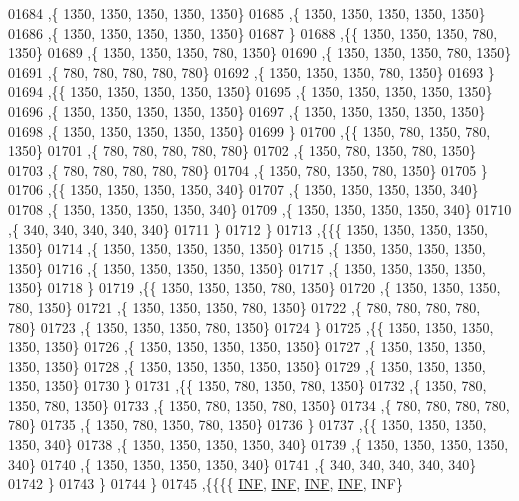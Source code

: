 \begin{DoxyCode}
01684    ,\{  1350,  1350,  1350,  1350,  1350\}
01685    ,\{  1350,  1350,  1350,  1350,  1350\}
01686    ,\{  1350,  1350,  1350,  1350,  1350\}
01687    \}
01688   ,\{\{  1350,  1350,  1350,   780,  1350\}
01689    ,\{  1350,  1350,  1350,   780,  1350\}
01690    ,\{  1350,  1350,  1350,   780,  1350\}
01691    ,\{   780,   780,   780,   780,   780\}
01692    ,\{  1350,  1350,  1350,   780,  1350\}
01693    \}
01694   ,\{\{  1350,  1350,  1350,  1350,  1350\}
01695    ,\{  1350,  1350,  1350,  1350,  1350\}
01696    ,\{  1350,  1350,  1350,  1350,  1350\}
01697    ,\{  1350,  1350,  1350,  1350,  1350\}
01698    ,\{  1350,  1350,  1350,  1350,  1350\}
01699    \}
01700   ,\{\{  1350,   780,  1350,   780,  1350\}
01701    ,\{   780,   780,   780,   780,   780\}
01702    ,\{  1350,   780,  1350,   780,  1350\}
01703    ,\{   780,   780,   780,   780,   780\}
01704    ,\{  1350,   780,  1350,   780,  1350\}
01705    \}
01706   ,\{\{  1350,  1350,  1350,  1350,   340\}
01707    ,\{  1350,  1350,  1350,  1350,   340\}
01708    ,\{  1350,  1350,  1350,  1350,   340\}
01709    ,\{  1350,  1350,  1350,  1350,   340\}
01710    ,\{   340,   340,   340,   340,   340\}
01711    \}
01712   \}
01713  ,\{\{\{  1350,  1350,  1350,  1350,  1350\}
01714    ,\{  1350,  1350,  1350,  1350,  1350\}
01715    ,\{  1350,  1350,  1350,  1350,  1350\}
01716    ,\{  1350,  1350,  1350,  1350,  1350\}
01717    ,\{  1350,  1350,  1350,  1350,  1350\}
01718    \}
01719   ,\{\{  1350,  1350,  1350,   780,  1350\}
01720    ,\{  1350,  1350,  1350,   780,  1350\}
01721    ,\{  1350,  1350,  1350,   780,  1350\}
01722    ,\{   780,   780,   780,   780,   780\}
01723    ,\{  1350,  1350,  1350,   780,  1350\}
01724    \}
01725   ,\{\{  1350,  1350,  1350,  1350,  1350\}
01726    ,\{  1350,  1350,  1350,  1350,  1350\}
01727    ,\{  1350,  1350,  1350,  1350,  1350\}
01728    ,\{  1350,  1350,  1350,  1350,  1350\}
01729    ,\{  1350,  1350,  1350,  1350,  1350\}
01730    \}
01731   ,\{\{  1350,   780,  1350,   780,  1350\}
01732    ,\{  1350,   780,  1350,   780,  1350\}
01733    ,\{  1350,   780,  1350,   780,  1350\}
01734    ,\{   780,   780,   780,   780,   780\}
01735    ,\{  1350,   780,  1350,   780,  1350\}
01736    \}
01737   ,\{\{  1350,  1350,  1350,  1350,   340\}
01738    ,\{  1350,  1350,  1350,  1350,   340\}
01739    ,\{  1350,  1350,  1350,  1350,   340\}
01740    ,\{  1350,  1350,  1350,  1350,   340\}
01741    ,\{   340,   340,   340,   340,   340\}
01742    \}
01743   \}
01744  \}
01745 ,\{\{\{\{   \hyperlink{energy__const_8h_a12c2040f25d8e3a7b9e1c2024c618cb6}{INF},   \hyperlink{energy__const_8h_a12c2040f25d8e3a7b9e1c2024c618cb6}{INF},   \hyperlink{energy__const_8h_a12c2040f25d8e3a7b9e1c2024c618cb6}{INF},   \hyperlink{energy__const_8h_a12c2040f25d8e3a7b9e1c2024c618cb6}{INF},   INF\}

\end{DoxyCode}
